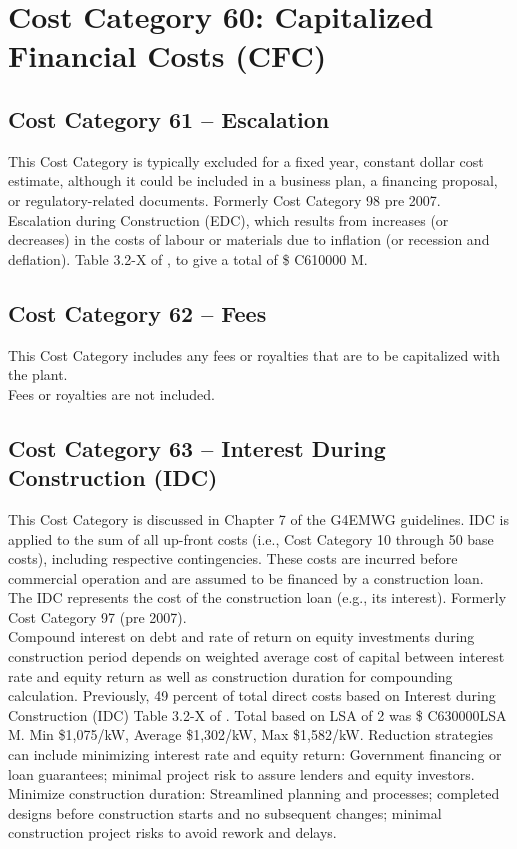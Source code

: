 
\section{Cost Category 60: Capitalized Financial Costs (CFC)}

\subsection*{Cost Category 61 – Escalation}
This Cost Category is typically excluded for a fixed year, constant dollar cost estimate, although it could be included in a business plan, a financing proposal, or regulatory-related documents.  Formerly Cost Category 98 pre 2007.\\

Escalation during Construction (EDC), which results from increases (or decreases) in the costs of labour
or materials due to inflation (or recession and deflation). Table 3.2-X of \cite{SCH78}, to give a total of \$ C610000 M.

\subsection*{Cost Category 62 – Fees}
This Cost Category includes any fees or royalties that are to be capitalized with the plant.\\

Fees or royalties are not included.

\subsection*{Cost Category 63 – Interest During Construction (IDC)}
This Cost Category is discussed in Chapter 7 of the G4EMWG guidelines. IDC is applied to the sum of all up-front costs (i.e., Cost Category 10 through 50 base costs), including respective contingencies. These costs are incurred before commercial operation and are assumed to be financed by a construction loan. The IDC represents the cost of the construction loan (e.g., its interest). Formerly Cost Category 97 (pre 2007).\\

Compound interest on debt and rate of return on equity investments during construction
period depends on weighted average cost of capital between interest rate and equity  return as well as construction duration for compounding calculation. Previously,  49 percent of total direct costs based on Interest during Construction (IDC) Table 3.2-X of \cite{SCH78}.  Total based on LSA of 2 was \$ C630000LSA M. Min \$1,075/kW, Average \$1,302/kW, Max \$1,582/kW. Reduction strategies can include minimizing interest rate and equity return: Government financing or loan guarantees; minimal project risk to assure lenders and equity investors. Minimize construction duration:  Streamlined planning and processes; completed designs before construction starts and no subsequent  changes; minimal construction project risks to avoid rework and delays.\\

